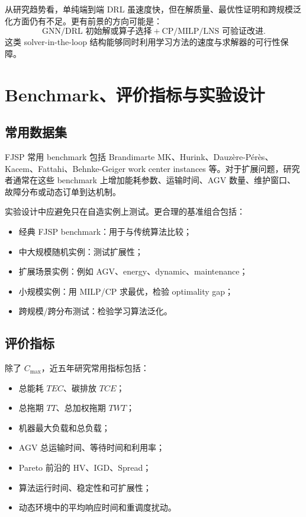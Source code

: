 \documentclass[UTF8,a4paper,11pt]{ctexart}
\newcommand{\Cmax}{C_{\max}}
\begin{document}
从研究趋势看，单纯端到端 DRL 虽速度快，但在解质量、最优性证明和跨规模泛化方面仍有不足。更有前景的方向可能是：
\[
\text{GNN/DRL 初始解或算子选择} + \text{CP/MILP/LNS 可验证改进}.
\]
这类 solver-in-the-loop 结构能够同时利用学习方法的速度与求解器的可行性保障。

\section{Benchmark、评价指标与实验设计}

\subsection{常用数据集}

FJSP 常用 benchmark 包括 Brandimarte MK、Hurink、Dauz\`ere-P\'er\`es、Kacem、Fattahi、Behnke-Geiger work center instances 等。对于扩展问题，研究者通常在这些 benchmark 上增加能耗参数、运输时间、AGV 数量、维护窗口、故障分布或动态订单到达机制。

实验设计中应避免只在自造实例上测试。更合理的基准组合包括：
\begin{itemize}
    \item 经典 FJSP benchmark：用于与传统算法比较；
    \item 中大规模随机实例：测试扩展性；
    \item 扩展场景实例：例如 AGV、energy、dynamic、maintenance；
    \item 小规模实例：用 MILP/CP 求最优，检验 optimality gap；
    \item 跨规模/跨分布测试：检验学习算法泛化。
\end{itemize}

\subsection{评价指标}

除了 $\Cmax$，近五年研究常用指标包括：
\begin{itemize}
    \item 总能耗 $TEC$、碳排放 $TCE$；
    \item 总拖期 $TT$、总加权拖期 $TWT$；
    \item 机器最大负载和总负载；
    \item AGV 总运输时间、等待时间和利用率；
    \item Pareto 前沿的 HV、IGD、Spread；
    \item 算法运行时间、稳定性和可扩展性；
    \item 动态环境中的平均响应时间和重调度扰动。
\end{itemize}
\end{document}
